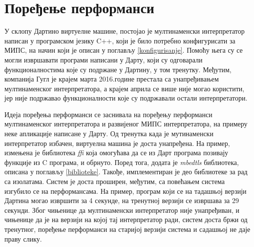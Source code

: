 \documentclass[12pt,oneside]{memoir}
\begin{document}
\section{Поређење перформанси}
\label{performanse}
У склопу Дартино виртуелне машине, постојао је мултинаменски интерпретатор написан у програмском језику C++, који је било потребно конфигурисати за МИПС, на начин који је описан у поглављу \ref{konfigurisanje}. Помоћу њега су се могли извршавати програми написани у Дарту, који су одговарали функционалностима које су подржане у Дартину, у том тренутку. Међутим, компанија Гугл је крајем марта 2016.године престала са унапређивањем мултинаменског интерпретатора, а крајем априла се више није могао користити, јер није подржавао функционалности које су подржавали остали интерпретатори.

Идеја поређења перформанси се заснивала на поређењу перформанси мултинаменског интерпретатора и развијеног МИПС интерпретатора, на примеру неке апликације написане у Дарту. Од тренутка када је мутинаменски интерпретатор избачен, виртуелна машина је доста унапређена. На пример, измењена је библиотека \textit{ffi} која омогућава да се из Дарт програма позивају функције из C програма, и обрнуто. Поред тога, додата је \textit{mbedtls} библиотека, описана у поглављу \ref{biblioteke}. Такође, имплементиран је део библиотеке за рад са изолатама. Систем је доста проширен, међутим, са повећањем система изгубило се на перформансама. На пример, програм који се на тадашњој верзији Дартина могао извршити за 4 секунде, на тренутној верзији се извршава за 29 секунди. Због чињенице да мултинаменски интерпретатор није унапређиван, и чињенице да је на верзији на којој тај интерпретатор ради, систем доста бржи од тренутног, поређење перформанси на старијој верзији система и садашњој не даје праву слику.
\end{document}
